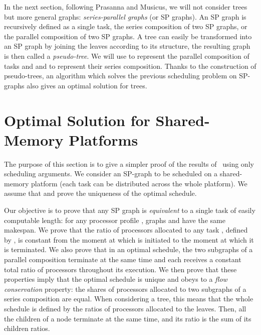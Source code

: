 \documentclass{llncs}
\newcommand{\fctofproc}{{processor profile}\xspace}
\begin{document}
In the next section, following Prasanna and Musicus, we will not
consider trees but more general graphs: \emph{series-parallel graphs}
(or SP graphs). An SP graph is recursively defined as a single task,
the series composition of two SP graphs, or the parallel composition
of two SP graphs. A tree can easily be transformed into an SP graph by joining the
leaves according to its structure, the resulting graph is then called a \emph{pseudo-tree}.  We will use
 to represent the parallel composition of tasks  and
 and  to represent their series composition. 
Thanks to the construction of pseudo-trees, an algorithm which solves
the previous scheduling problem on SP-graphs also gives an optimal
solution for trees.





\section{Optimal Solution for Shared-Memory Platforms}

\label{sec:shared}





The purpose of this section is to give a simpler proof of the results
of~\cite{prasmus,prasmus2} using only scheduling arguments. We
consider an SP-graph to be scheduled on a shared-memory platform
(each task can be distributed across the whole platform). We assume
that  and prove the uniqueness of 
 the optimal schedule.

Our objective is to prove that any SP graph  is \emph{equivalent}
to a single task  of easily computable length: for any \fctofproc
, graphs  and  have the same makespan. We prove that the
ratio of processors allocated to any task , defined by
, is constant from the
moment at which  is initiated to the moment at which it is
terminated. We also prove that in an optimal schedule, the two
subgraphs of a parallel composition terminate at the same
time and each receives a constant total ratio of processors throughout
its execution.
We then prove that these properties imply that the optimal schedule is unique and obeys
to a {\it flow conservation} property: the shares of processors
allocated to two subgraphs of a series composition are equal. When
considering a tree, this means that the whole schedule is defined by
the ratios of processors allocated to the leaves. Then, all the children of a node  terminate at the
same time, and its ratio is the sum of its children
ratios.
\end{document}
